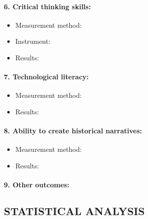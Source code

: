 \documentclass[
hf,
]{ceurart}
\begin{document}
\paragraph{6. Critical thinking skills:}
\begin{itemize}
    \item Measurement method: \underline{\hspace{4cm}}
    \item Instrument: \underline{\hspace{4cm}}
    \item Results: \underline{\hspace{6cm}}
\end{itemize}

\paragraph{7. Technological literacy:}
\begin{itemize}
    \item Measurement method: \underline{\hspace{4cm}}
    \item Results: \underline{\hspace{6cm}}
\end{itemize}

\paragraph{8. Ability to create historical narratives:}
\begin{itemize}
    \item Measurement method: \underline{\hspace{4cm}}
    \item Results: \underline{\hspace{6cm}}
\end{itemize}

\paragraph{9. Other outcomes:} \underline{\hspace{8cm}}

\subsection*{STATISTICAL ANALYSIS}
\end{document}
